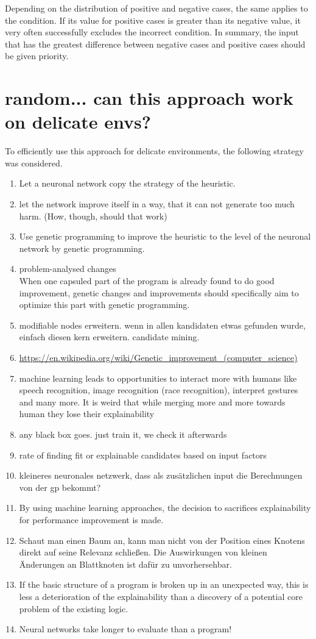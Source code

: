 Depending on the distribution of positive and negative cases, the same applies to the condition. If its value for positive cases is greater than its negative value, it very often successfully excludes the incorrect condition.
In summary, the input that has the greatest difference between negative cases and positive cases should be given priority.


\section{random... can this approach work on delicate envs?}
To efficiently use this approach for delicate environments, the following strategy was considered.
\begin{enumerate}
    \item Let a neuronal network copy the strategy of the heuristic.
    \item let the network improve itself in a way, that it can not generate too much harm. (How, though, should that work)
    \item Use genetic programming to improve the heuristic to the level of the neuronal network by genetic programming.
        
    \item problem-analysed changes\\
    When one capsuled part of the program is already found to do good improvement, genetic changes and improvements should specifically aim to optimize this part with genetic programming.
    \item modifiable nodes erweitern. wenn in allen kandidaten etwas gefunden wurde, einfach diesen kern erweitern. candidate mining.
    \item \url{https://en.wikipedia.org/wiki/Genetic_improvement_(computer_science)}
    \item machine learning leads to opportunities to interact more with humans like speech recognition, image recognition (race recognition), interpret gestures and many more. It is weird that while merging more and more towards human they lose their explainability
    \item any black box goes. just train it, we check it afterwards
    \item rate of finding fit or explainable candidates based on input factors
    \item kleineres neuronales netzwerk, dass als zusätzlichen input die Berechnungen von der gp bekommt?
    \item By using machine learning approaches, the decision to sacrifices explainability for performance improvement is made.
    \item Schaut man einen Baum an, kann man nicht von der Position eines Knotens direkt auf seine Relevanz schließen. Die Auswirkungen von kleinen Änderungen an Blattknoten ist dafür zu unvorhersehbar.
    \item If the basic structure of a program is broken up in an unexpected way, this is less a deterioration of the explainability than a discovery of a potential core problem of the existing logic.
    \item Neural networks take longer to evaluate than a program!
\end{enumerate}

